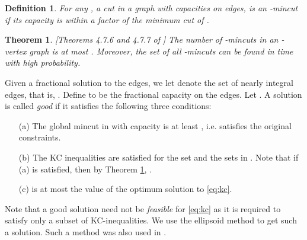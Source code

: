 \documentclass[11pt]{article}
\newcounter{thm0Rcopies}
\newcounter{thm_saved}
\newtheorem{theorem}[lemma]{Theorem}
\newtheorem{definition}[lemma]{Definition}
\def\script#1{\mathcal{#1}}
\def\KCLP{\eqref{eq:kc}\xspace}
\begin{document}
\begin{definition}
  For any , a cut in a graph  with capacities on
  edges, is an \emph{-mincut} if its capacity is within a
  factor  of the minimum cut of .
\end{definition}

\begin{theorem}\label{thm:cutCounting}
  {\rm [Theorems 4.7.6 and 4.7.7 of \cite{Karger}]}
  The number of -mincuts in an -vertex graph is at most
  . Moreover, the set of all -mincuts can be found in
   time with high probability.
\end{theorem}
\def\u{\hat{u}} \def\S{\script{S}} Given a fractional solution  to
the edges, we let  denote the set of nearly integral edges, that
is, .  Define
 to be the fractional capacity on the edges.
Let .  A solution 
is called {\em good} if it satisfies the following three
conditions:

\begin{enumerate}
\item[(a)] The global mincut in  with capacity  is at least
  , i.e.  satisfies the original constraints.
\item[(b)] The KC inequalities are satisfied for the set  and the
  sets in . Note that if (a) is satisfied, then by Theorem
  \ref{thm:cutCounting}, .
\item[(c)]  is at most the value of the optimum
  solution to \KCLP.
\end{enumerate}


Note that a good solution need not be {\em feasible} for \KCLP as it is required
to satisfy only a subset of KC-inequalities. We use the ellipsoid method to
get such a solution. Such a method was also used in \cite{CFLP}.
\end{document}
